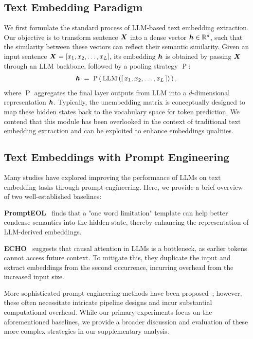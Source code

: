 \documentclass[sigconf]{acmart}
\begin{document}
\subsection{Text Embedding Paradigm}
We first formulate the standard process of LLM-based text embedding extraction. 
Our objective is to transform sentence \({\bm{X}}\) into a dense vector \( {\bm{h}} \in \mathbb{R}^d\), such that the similarity between these vectors can reflect their semantic similarity.
Given an input sentence \({\bm{X}}=\left[x_1,x_2,\dots,x_L\right]\), its embedding \( {\bm{h}} \) is obtained by passing \({\bm{X}}\) through an LLM backbone, followed by a pooling strategy \(\operatorname{P}\):
{\Large \[
{\bm{h}} \; = \; \operatorname{P} \left (\,\operatorname{LLM}\,(\left[\,x_1,x_2,\dots,x_L\,\right]) \,\right),
\]}
where \( \operatorname{P} \) aggregates the final layer outputs from \(\textrm{LLM}\) into a \(d\)-dimensional representation \( {\bm{h}} \).
Typically, the unembedding matrix is conceptually designed to map these hidden states back to the vocabulary space for token prediction.
We contend that this module has been overlooked in the context of traditional text embedding extraction and can be exploited to enhance embeddings qualities.

\subsection{Text Embeddings with Prompt Engineering}

Many studies have explored improving the performance of LLMs on text embedding tasks through prompt engineering. 
Here, we provide a brief overview of two well-established baselines:

\textbf{PromptEOL}~\cite{prompteol} finds that a "one word limitation" template can help better condense semantics into the hidden state, thereby enhancing the representation of LLM-derived embeddings.

\textbf{ECHO}~\cite{echo} suggests that causal attention in LLMs is a bottleneck, as earlier tokens cannot access future context. 
To mitigate this, they duplicate the input and extract embeddings from the second occurrence, incurring overhead from the increased input size.

More sophisticated prompt-engineering methods have been proposed~\cite{metaeol,geneol}; however, these often necessitate intricate pipeline designs and incur substantial computational overhead. While our primary experiments focus on the aforementioned baselines, we provide a broader discussion and evaluation of these more complex strategies in our supplementary analysis.
\end{document}
